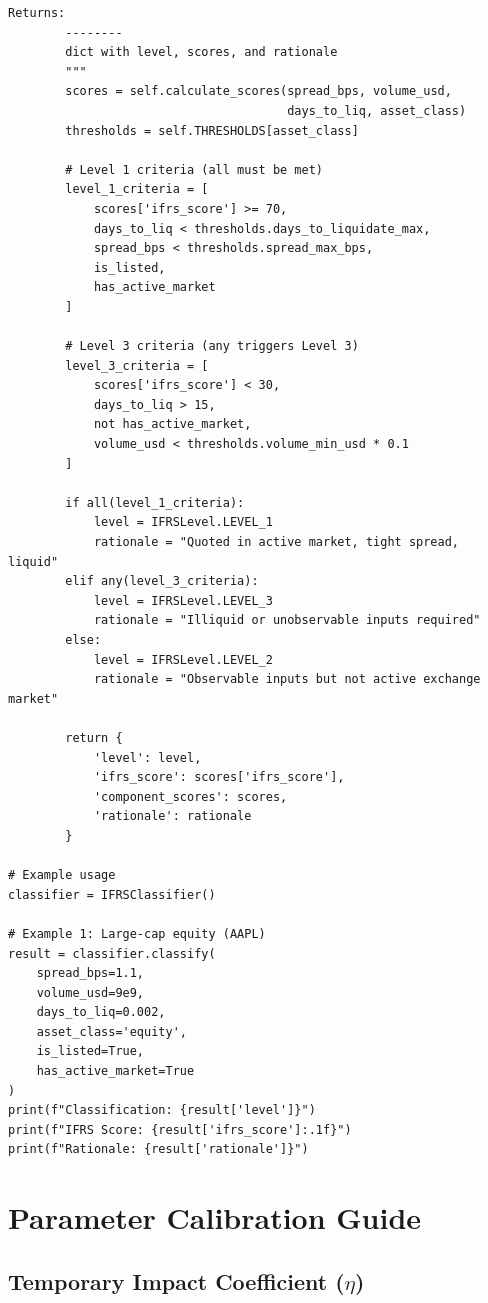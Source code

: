 \documentclass[11pt,a4paper]{article}
\begin{document}
\begin{lstlisting}[caption=IFRS Level Classification]
        Returns:
        --------
        dict with level, scores, and rationale
        """
        scores = self.calculate_scores(spread_bps, volume_usd,
                                       days_to_liq, asset_class)
        thresholds = self.THRESHOLDS[asset_class]

        # Level 1 criteria (all must be met)
        level_1_criteria = [
            scores['ifrs_score'] >= 70,
            days_to_liq < thresholds.days_to_liquidate_max,
            spread_bps < thresholds.spread_max_bps,
            is_listed,
            has_active_market
        ]

        # Level 3 criteria (any triggers Level 3)
        level_3_criteria = [
            scores['ifrs_score'] < 30,
            days_to_liq > 15,
            not has_active_market,
            volume_usd < thresholds.volume_min_usd * 0.1
        ]

        if all(level_1_criteria):
            level = IFRSLevel.LEVEL_1
            rationale = "Quoted in active market, tight spread, liquid"
        elif any(level_3_criteria):
            level = IFRSLevel.LEVEL_3
            rationale = "Illiquid or unobservable inputs required"
        else:
            level = IFRSLevel.LEVEL_2
            rationale = "Observable inputs but not active exchange market"

        return {
            'level': level,
            'ifrs_score': scores['ifrs_score'],
            'component_scores': scores,
            'rationale': rationale
        }

# Example usage
classifier = IFRSClassifier()

# Example 1: Large-cap equity (AAPL)
result = classifier.classify(
    spread_bps=1.1,
    volume_usd=9e9,
    days_to_liq=0.002,
    asset_class='equity',
    is_listed=True,
    has_active_market=True
)
print(f"Classification: {result['level']}")
print(f"IFRS Score: {result['ifrs_score']:.1f}")
print(f"Rationale: {result['rationale']}")
\end{lstlisting}

\section{Parameter Calibration Guide}

\subsection{Temporary Impact Coefficient ($\eta$)}
\end{document}
